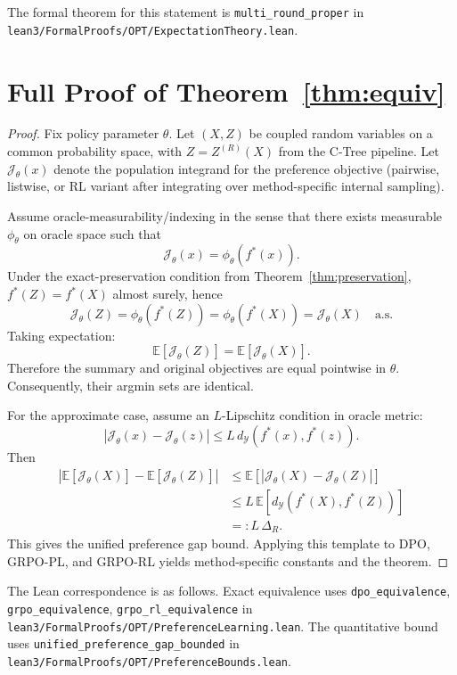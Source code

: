 \documentclass[11pt]{article}
\newcommand{\E}{\mathbb{E}}
\newcommand{\Y}{\mathcal{Y}}
\newcommand{\metric}{d_{\Y}}
\newcommand{\fstar}{f^\ast}
\begin{document}
The formal theorem for this statement is
\texttt{multi\_round\_proper} in
\texttt{lean3/FormalProofs/OPT/ExpectationTheory.lean}.

\section{Full Proof of Theorem~\ref{thm:equiv}}\label{app:proof-equivalence}

\begin{proof}
Fix policy parameter $\theta$.
Let $(X,Z)$ be coupled random variables on a common probability space, with
$Z=Z^{(R)}(X)$ from the C-Tree pipeline.
Let $\mathcal{J}_\theta(x)$ denote the population integrand for the preference objective (pairwise, listwise, or RL variant after integrating over method-specific internal sampling).

Assume oracle-measurability/indexing in the sense that there exists measurable
$\phi_\theta$ on oracle space such that
\[
\mathcal{J}_\theta(x)=\phi_\theta(\fstar(x)).
\]
Under the exact-preservation condition from Theorem~\ref{thm:preservation},
$\fstar(Z)=\fstar(X)$ almost surely, hence
\[
\mathcal{J}_\theta(Z)=\phi_\theta(\fstar(Z))
=\phi_\theta(\fstar(X))
=\mathcal{J}_\theta(X)
\quad\text{a.s.}
\]
Taking expectation:
\[
\E[\mathcal{J}_\theta(Z)]=\E[\mathcal{J}_\theta(X)].
\]
Therefore the summary and original objectives are equal pointwise in $\theta$.
Consequently, their argmin sets are identical.

For the approximate case, assume an $L$-Lipschitz condition in oracle metric:
\[
|\mathcal{J}_\theta(x)-\mathcal{J}_\theta(z)|
\le L\,\metric(\fstar(x),\fstar(z)).
\]
Then
\begin{align*}
\left|\E[\mathcal{J}_\theta(X)]-\E[\mathcal{J}_\theta(Z)]\right|
&\le \E\left[\left|\mathcal{J}_\theta(X)-\mathcal{J}_\theta(Z)\right|\right] \\
&\le L\,\E\left[\metric(\fstar(X),\fstar(Z))\right] \\
&=: L\,\Delta_R.
\end{align*}
This gives the unified preference gap bound.
Applying this template to DPO, GRPO-PL, and GRPO-RL yields method-specific constants and the theorem.
\end{proof}

The Lean correspondence is as follows. Exact equivalence uses
\texttt{dpo\_equivalence}, \texttt{grpo\_equivalence},
\texttt{grpo\_rl\_equivalence} in
\texttt{lean3/FormalProofs/OPT/PreferenceLearning.lean}.
The quantitative bound uses
\texttt{unified\_preference\_gap\_bounded} in
\texttt{lean3/FormalProofs/OPT/PreferenceBounds.lean}.
\end{document}

